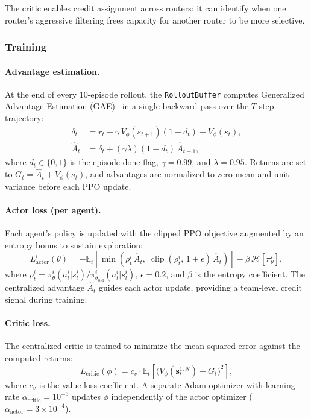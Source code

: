 \documentclass[sigconf,nonacm]{acmart}
\begin{document}
The critic enables credit assignment across routers: it can identify when one router's aggressive filtering frees capacity for another router to be more selective.

\subsubsection{Training}

\paragraph{Advantage estimation.}
At the end of every 10-episode rollout, the \texttt{RolloutBuffer} computes Generalized Advantage Estimation (GAE)~\cite{schulman2015high} in a single backward pass over the $T$-step trajectory:
\begin{align}
    \delta_t &= r_t + \gamma\, V_\phi(s_{t+1})(1 - d_t) - V_\phi(s_t), \\
    \hat{A}_t &= \delta_t + (\gamma\lambda)(1 - d_t)\,\hat{A}_{t+1},
\end{align}
where $d_t \in \{0,1\}$ is the episode-done flag, $\gamma = 0.99$, and $\lambda = 0.95$.
Returns are set to $G_t = \hat{A}_t + V_\phi(s_t)$, and advantages are normalized to zero mean and unit variance before each PPO update.

\paragraph{Actor loss (per agent).}
Each agent's policy is updated with the clipped PPO objective augmented by an entropy bonus to sustain exploration:
\begin{equation}
    L^i_\text{actor}(\theta) = -\mathbb{E}_t\!\left[\min\!\left(\rho^i_t\,\hat{A}_t,\;\operatorname{clip}(\rho^i_t,\,1\pm\epsilon)\,\hat{A}_t\right)\right] - \beta\,\mathcal{H}[\pi^i_\theta],
\end{equation}
where $\rho^i_t = \pi^i_\theta(a^i_t | s^i_t)/\pi^i_{\theta_\text{old}}(a^i_t | s^i_t)$, $\epsilon = 0.2$, and $\beta$ is the entropy coefficient.
The centralized advantage $\hat{A}_t$ guides each actor update, providing a team-level credit signal during training.

\paragraph{Critic loss.}
The centralized critic is trained to minimize the mean-squared error against the computed returns:
\begin{equation}
    L_\text{critic}(\phi) = c_v \cdot \mathbb{E}_t\!\left[\bigl(V_\phi(\mathbf{s}^{1:N}_t) - G_t\bigr)^2\right],
\end{equation}
where $c_v$ is the value loss coefficient. A separate Adam optimizer with learning rate $\alpha_\text{critic} = 10^{-3}$ updates $\phi$ independently of the actor optimizer ($\alpha_\text{actor} = 3 \times 10^{-4}$).
\end{document}
